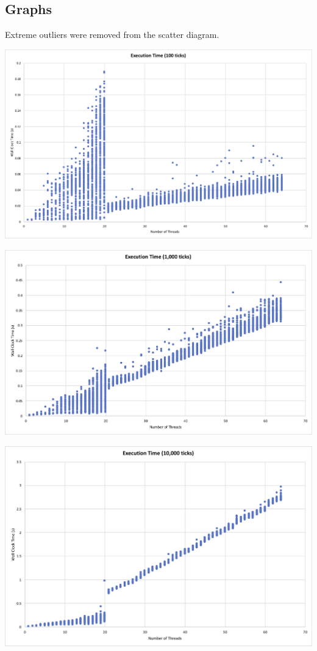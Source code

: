 \documentclass[a4paper,12pt]{article}
\begin{document}
\subsection{Graphs}
Extreme outliers were removed from the scatter diagram.
\begin{center}
	\centering
	\includegraphics[width=\linewidth]{100-time}
\end{center}
\begin{center}
	\centering
	\includegraphics[width=\linewidth]{1000-time}
\end{center}
\begin{center}
	\centering
	\includegraphics[width=\linewidth]{10000-time}
\end{center}
\end{document}
